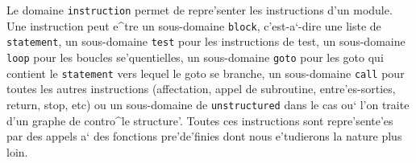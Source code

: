 { 
Le domaine \verb/instruction/ permet de repre'senter les instructions
d'un module. Une instruction peut e^tre un sous-domaine \verb/block/,
c'est-a`-dire une liste de \verb/statement/, un sous-domaine \verb/test/
pour les instructions de test, un sous-domaine \verb/loop/ pour les
boucles se'quentielles, un sous-domaine \verb/goto/ pour les goto qui
contient le
\verb/statement/ vers lequel le goto se branche, un sous-domaine
\verb/call/ pour toutes les autres instructions (affectation, appel de
subroutine, entre'es-sorties, return, stop, etc) ou un sous-domaine de
\verb/unstructured/ dans le cas ou` l'on traite d'un graphe de contro^le
structure'. Toutes ces instructions 
sont repre'sente'es par des appels a` des fonctions pre'de'finies dont
nous e'tudierons la nature plus loin.
}

